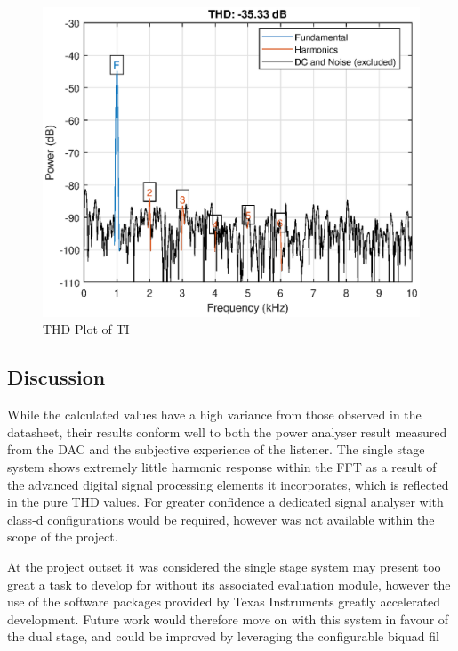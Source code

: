 \documentclass[main.tex]{subfiles}
\begin{document}
\begin{figure}[H]
    \centering
    \includegraphics[scale=0.75]{./figs/tiTHDPlot.eps}        
    \caption{THD Plot of TI}
    \label{fig:ti-thd}
\end{figure}

\subsection{Discussion}

While the calculated values have a high variance from those observed in the datasheet, their results conform well to both the power analyser result measured from the DAC and the subjective experience of the listener. The single stage system shows extremely little harmonic response within the FFT as a result of the advanced digital signal processing elements it incorporates, which is reflected in the pure THD values. For greater confidence a dedicated signal analyser with class-d configurations would be required, however was not available within the scope of the project. 
\par 
At the project outset it was considered the single stage system may present too great a task to develop for without its associated evaluation module, however the use of the software packages provided by Texas Instruments greatly accelerated development. Future work would therefore move on with this system in favour of the dual stage, and could be improved by leveraging the configurable biquad fil
\end{document}
